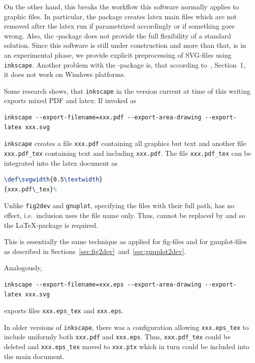 On the other hand, 
this breaks the workflow this software normally applies to graphic files. 
In particular, the package creates latex main files 
which are not removed after the latex run 
if parametrized accordingly or if something goes wrong. 
Also, the -package does not provide the full flexibility 
of a standard solution. 
Since this software is still under construction 
and more than that, is in an experimental phase, 
we provide explicit preprocessing of SVG-files using \texttt{inkscape}. 
Another problem with the -package is, 
that according to~\cite{SvgP}, Section~1, 
it does not work on Windows platforms. 


Some research shows,
that \texttt{inkscape} in the version current at time of this writing
exports mixed PDF and latex: If invoked as 
%
\begin{Verbatim}[fontsize=\footnotesize]
inkscape --export-filename=xxx.pdf --export-area-drawing --export-latex xxx.svg 
\end{Verbatim}
%
\texttt{inkscape} creates a file \texttt{xxx.pdf}
containing all graphics but text and another file \texttt{xxx.pdf\_tex}
containing text and including \texttt{xxx.pdf}.
The file \texttt{xxx.pdf\_tex}
can be integrated into the latex document as
%
\begin{lstlisting}[language=TeX]
\def\svgwidth{0.5\textwidth}
{xxx.pdf\_tex}%
\end{lstlisting}
%
Unlike \texttt{fig2dev} and \texttt{gnuplot}, 
specifying the files with their full path, 
has no effect, i.e.~inclusion uses the file name only. 
Thus,  cannot be replaced by  
and so the \LaTeX-package  is required. 
 

This is essentially the same technique as applied for fig-files 
and for gnuplot-files as described 
in Sections~\ref{sec:fig2dev}~and~\ref{sec:gnuplot2dev}. 

Analogously,
%
\begin{Verbatim}[fontsize=\footnotesize]
inkscape --export-filename=xxx.eps --export-area-drawing --export-latex xxx.svg 
\end{Verbatim}
%
exports files \texttt{xxx.eps\_tex} and \texttt{xxx.eps}.

In older versions of \texttt{inkscape},
there was a configuration allowing \texttt{xxx.eps\_tex}
to include uniformly both \texttt{xxx.pdf} and \texttt{xxx.eps}.
Thus, \texttt{xxx.pdf\_tex} could be deleted
and \texttt{xxx.eps\_tex} moved to \texttt{xxx.ptx}
which in turn could be included into the main document.

